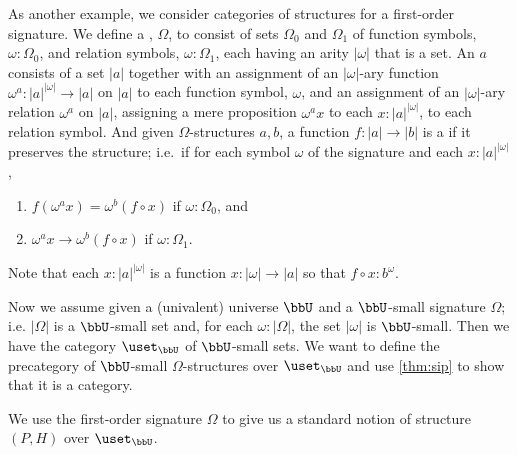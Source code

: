 As another example, we consider categories of structures for a first-order signature.
We define a ,
%
%
$\Omega$, to consist of sets $\Omega_0$ and $\Omega_1$ of function symbols, $\omega:\Omega_0$, and relation symbols, $\omega:\Omega_1$, each having an arity $|\omega|$ that is a set.
An 
%
%
$a$ consists of a set $|a|$ together with an assignment of an $|\omega|$-ary function $\omega^a:|a|^{|\omega|}\to |a|$ on $|a|$ to each function symbol, $\omega$, and an assignment of an $|\omega|$-ary relation $\omega^a$ on $|a|$, assigning a mere proposition $\omega^ax$ to each $x:|a|^{|\omega|}$, to each relation symbol.
And given $\Omega$-structures $a,b$, a function $f:|a|\to |b|$ is a 
%
%
if it preserves the structure; i.e.\ if for each symbol $\omega$ of the signature and each $x:|a|^{|\omega|}$,
\begin{enumerate}
\item $f(\omega^ax) = \omega^b(f\circ x)$ if $\omega:\Omega_0$, and
\item $\omega^ax\to\omega^b(f\circ x)$ if $\omega:\Omega_1$.
\end{enumerate}
Note that each $x:|a|^{|\omega|}$ is a function $x:|\omega|\to |a|$ so that $f\circ x : b^\omega$.

Now we assume given a (univalent) universe $\bbU$ and a $\bbU$-small signature $\Omega$; i.e. $|\Omega|$ is a $\bbU$-small set and, for each $\omega:|\Omega|$, the set $|\omega|$ is $\bbU$-small.
Then we have the category $\uset_\bbU$ of $\bbU$-small sets.  We want to define the precategory of $\bbU$-small $\Omega$-structures over $\uset_\bbU$ and use \cref{thm:sip} to show that it is a category.

We use the first-order signature $\Omega$ to give us a standard notion of structure $(P,H)$ over $\uset_\bbU$.

